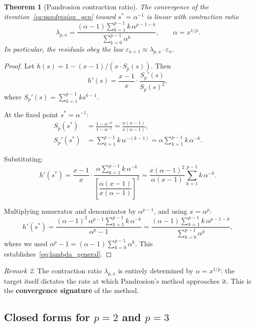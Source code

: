 \documentclass[10pt,a4paper,oneside]{book}
\newtheorem{theorem}{Theorem}[chapter]
\theoremstyle{definition}
\theoremstyle{remark}
\newtheorem{remark}[theorem]{Remark}
\newcommand{\eps}{\varepsilon}
\begin{document}
\begin{theorem}[Pandrosion contraction ratio]
\label{thm:lambda}
The convergence of the iteration~\eqref{eq:pandrosion_gen} toward $s^* = \alpha^{-1}$ is \emph{linear} with contraction ratio
\begin{equation}
  \label{eq:lambda_general}
  \boxed{
  \lambda_{p,x} = \frac{(\alpha - 1)\displaystyle\sum_{k=1}^{p-1} k\,\alpha^{p-1-k}}{\displaystyle\sum_{k=0}^{p-1} \alpha^k}
  }, \qquad \alpha = x^{1/p}.
\end{equation}
In particular, the residuals obey the law $\eps_{n+1} \approx \lambda_{p,x} \cdot \eps_n$.
\end{theorem}

\begin{proof}
Let $h(s) = 1 - (x-1)/(x \cdot S_p(s))$. Then
\[
  h'(s) = \frac{x-1}{x} \cdot \frac{S_p'(s)}{S_p(s)^2},
\]
where $S_p'(s) = \sum_{k=1}^{p-1} k s^{k-1}$.

At the fixed point $s^* = \alpha^{-1}$:
\begin{align*}
  S_p(s^*) &= \frac{1 - \alpha^{-p}}{1 - \alpha^{-1}} = \frac{\alpha(x-1)}{x(\alpha-1)}, \\
  S_p'(s^*) &= \sum_{k=1}^{p-1} k\,\alpha^{-(k-1)} = \alpha \sum_{k=1}^{p-1} k\,\alpha^{-k}.
\end{align*}

Substituting:
\[
  h'(s^*) = \frac{x-1}{x} \cdot \frac{\alpha \sum_{k=1}^{p-1} k\,\alpha^{-k}}{\left[\dfrac{\alpha(x-1)}{x(\alpha-1)}\right]^2}
  = \frac{x(\alpha-1)^2}{\alpha(x-1)} \sum_{k=1}^{p-1} k\,\alpha^{-k}.
\]

Multiplying numerator and denominator by $\alpha^{p-1}$, and using $x = \alpha^p$:
\[
  h'(s^*) = \frac{(\alpha-1)^2\,\alpha^{p-1}\sum_{k=1}^{p-1}k\,\alpha^{-k}}{\alpha^p - 1}
  = \frac{(\alpha-1)\sum_{k=1}^{p-1}k\,\alpha^{p-1-k}}{\sum_{k=0}^{p-1}\alpha^k},
\]
where we used $\alpha^p - 1 = (\alpha-1)\sum_{k=0}^{p-1}\alpha^k$. This establishes~\eqref{eq:lambda_general}.
\end{proof}

\begin{remark}
The contraction ratio $\lambda_{p,x}$ is entirely determined by $\alpha = x^{1/p}$: the target itself dictates the rate at which Pandrosion's method approaches it. This is the \textbf{convergence signature} of the method.
\end{remark}

\subsection{Closed forms for \texorpdfstring{$p=2$}{p=2} and \texorpdfstring{$p=3$}{p=3}}
\end{document}
